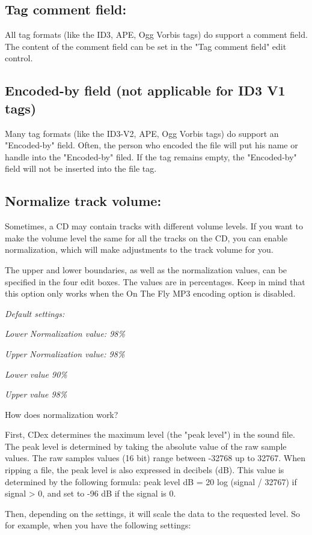 \subsection{Tag comment field:}
All tag formats (like the ID3, APE, Ogg Vorbis tags) do support a comment field. The
content of the comment field can be set in the "Tag comment field" edit control.

\subsection{Encoded-by field (not applicable for ID3 V1 tags)}
Many tag formats (like the ID3-V2, APE, Ogg Vorbis tags) do support an "Encoded-by" field. Often,
the person who encoded the file will put his name or handle into the "Encoded-by" filed. If the
tag remains empty, the "Encoded-by" field will not be inserted into the file tag.

\subsection{Normalize track volume:}
Sometimes, a CD may contain tracks with different volume levels. If
you want to make the volume level the same for all the tracks on the CD, you can enable
normalization, which will make adjustments to the track volume for you.

The upper and lower boundaries, as well as the normalization values, can 
be specified in the four edit boxes. The values are in percentages. Keep in mind 
that this option only works when the On The Fly MP3 encoding option is disabled.

{\it Default settings:}

{\it Lower Normalization value: 98\%}

{\it Upper Normalization value: 98\%}

{\it Lower  value 90\% }

{\it Upper value 98\%}


How does normalization work?

First, CDex determines the maximum level (the "peak level") in the sound file.  The peak
level is determined by taking the absolute value of the raw sample values. The raw
samples values (16 bit) range between -32768 up to 32767. When ripping a file, the 
peak level is also expressed in decibels (dB).  This value is determined by the following formula:
peak level dB = 20 log (signal / 32767) if signal > 0, and set to -96 dB if the
signal is 0.


Then, depending on the settings, it will scale the data to the requested level. So for example, when you have the following settings:

